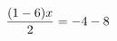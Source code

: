\documentclass[preview]{standalone}
\begin{document}
\begin{align*}
\special{dvisvgm:raw <g id='unique000'>}\frac{(1 - 6) x}{2} = -4 - 8\special{dvisvgm:raw </g>}
\end{align*}
\end{document}
